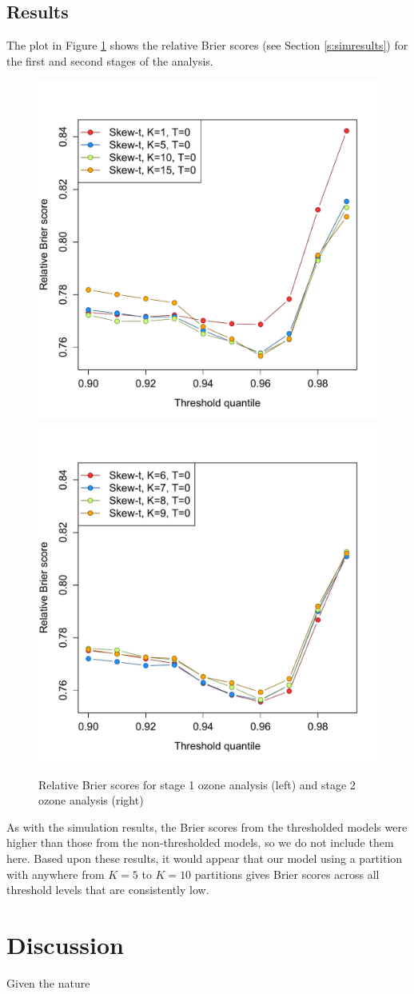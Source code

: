 \documentclass[11pt]{article}
\begin{document}
\subsection{Results}\label{s:results}
The plot in Figure \ref{fig:bs-ozone} shows the relative Brier scores (see Section \ref{s:simresults}) for the first and second stages of the analysis.
\begin{figure}
  \includegraphics[width=0.5\linewidth]{plots/bs-ozone-1.pdf}
  \includegraphics[width=0.5\linewidth]{plots/bs-ozone-2.pdf}
  \caption{Relative Brier scores for stage 1 ozone analysis (left) and stage 2 ozone analysis (right)}
  \label{fig:bs-ozone}
\end{figure}
As with the simulation results, the Brier scores from the thresholded models were higher than those from the non-thresholded models, so we do not include them here.
Based upon these results, it would appear that our model using a partition with anywhere from $K = 5$ to $K = 10$ partitions gives Brier scores across all threshold levels that are consistently low.

\section{Discussion}\label{s:con}
Given the nature
\end{document}
